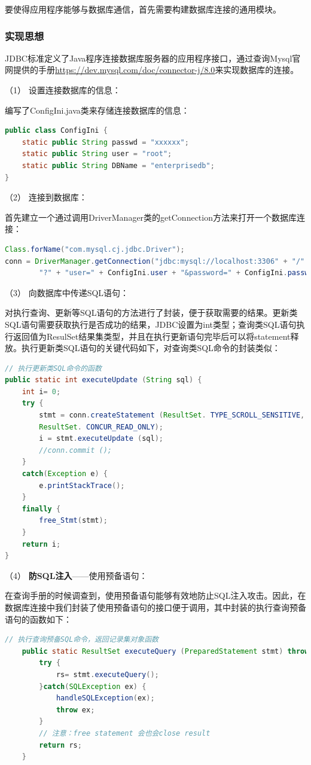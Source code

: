 \documentclass[withoutpreface,bwprint]{cumcmthesis} %
\newcommand{\kuohao}[1]{ \noindent （#1）}
\begin{document}
要使得应用程序能够与数据库通信，首先需要构建数据库连接的通用模块。

\subsubsection{实现思想}
JDBC标准定义了Java程序连接数据库服务器的应用程序接口，通过查询Mysql官网提供的手册\url{https://dev.mysql.com/doc/connector-j/8.0}来实现数据库的连接。

\vspace{1em}

\kuohao{1} 设置连接数据库的信息：

编写了ConfigIni.java类来存储连接数据库的信息：
\begin{lstlisting}[language=java]
public class ConfigIni {
    static public String passwd = "xxxxxx";
    static public String user = "root";
    static public String DBName = "enterprisedb";
}
\end{lstlisting}

\kuohao{2} 连接到数据库：

首先建立一个通过调用DriverManager类的getConnection方法来打开一个数据库连接：
\begin{lstlisting}[language=java]
Class.forName("com.mysql.cj.jdbc.Driver");
conn = DriverManager.getConnection("jdbc:mysql://localhost:3306" + "/" + ConfigIni.DBName +
        "?" + "user=" + ConfigIni.user + "&password=" + ConfigIni.passwd + "&serverTimezone=UTC");
\end{lstlisting}

\kuohao{3} 向数据库中传递SQL语句：

对执行查询、更新等SQL语句的方法进行了封装，便于获取需要的结果。更新类SQL语句需要获取执行是否成功的结果，JDBC设置为int类型；查询类SQL语句执行返回值为ResulSet结果集类型，并且在执行更新语句完毕后可以将statement释放。执行更新类SQL语句的关键代码如下，对查询类SQL命令的封装类似：
\begin{lstlisting}[language=java]
// 执行更新类SQL命令的函数
public static int executeUpdate (String sql) {
    int i= 0;
    try {
        stmt = conn.createStatement (ResultSet. TYPE_SCROLL_SENSITIVE,
        ResultSet. CONCUR_READ_ONLY);
        i = stmt.executeUpdate (sql);
        //conn.commit ();
    }
    catch(Exception e) {
        e.printStackTrace();
    }
    finally {
        free_Stmt(stmt);
    }
    return i;
}
\end{lstlisting}

\kuohao{4} \textbf{防SQL注入}——使用预备语句：

在查询手册的时候调查到，使用预备语句能够有效地防止SQL注入攻击。因此，在数据库连接中我们封装了使用预备语句的接口便于调用，其中封装的执行查询预备语句的函数如下：
\begin{lstlisting}[language=java]
// 执行查询预备SQL命令，返回记录集对象函数
    public static ResultSet executeQuery (PreparedStatement stmt) throws SQLException{
        try {
            rs= stmt.executeQuery();
        }catch(SQLException ex) {
            handleSQLException(ex);
            throw ex;
        }
        // 注意：free statement 会也会close result
        return rs;
    }
\end{lstlisting}
\end{document}
